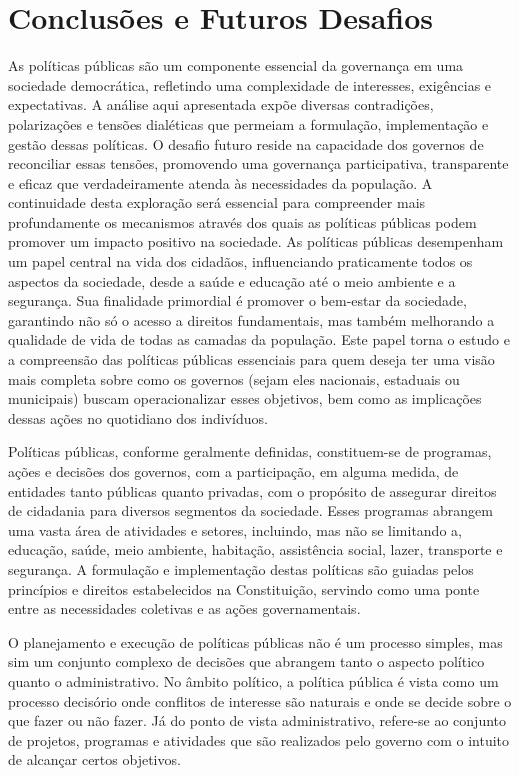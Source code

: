 \documentclass[
   article,       
   12pt,          
   oneside,       
   a4paper,       
   english,       
   brazil,        
   sumario=tradicional
   ]{abntex2}
\begin{document}
\section{Conclusões e Futuros Desafios}
As políticas públicas são um componente essencial da governança em uma sociedade democrática, refletindo uma complexidade de interesses, exigências e expectativas. A análise aqui apresentada expõe diversas contradições, polarizações e tensões dialéticas que permeiam a formulação, implementação e gestão dessas políticas. O desafio futuro reside na capacidade dos governos de reconciliar essas tensões, promovendo uma governança participativa, transparente e eficaz que verdadeiramente atenda às necessidades da população. A continuidade desta exploração será essencial para compreender mais profundamente os mecanismos através dos quais as políticas públicas podem promover um impacto positivo na sociedade.
As políticas públicas desempenham um papel central na vida dos cidadãos, influenciando praticamente todos os aspectos da sociedade, desde a saúde e educação até o meio ambiente e a segurança. Sua finalidade primordial é promover o bem-estar da sociedade, garantindo não só o acesso a direitos fundamentais, mas também melhorando a qualidade de vida de todas as camadas da população. Este papel torna o estudo e a compreensão das políticas públicas essenciais para quem deseja ter uma visão mais completa sobre como os governos (sejam eles nacionais, estaduais ou municipais) buscam operacionalizar esses objetivos, bem como as implicações dessas ações no quotidiano dos indivíduos.

Políticas públicas, conforme geralmente definidas, constituem-se de programas, ações e decisões dos governos, com a participação, em alguma medida, de entidades tanto públicas quanto privadas, com o propósito de assegurar direitos de cidadania para diversos segmentos da sociedade. Esses programas abrangem uma vasta área de atividades e setores, incluindo, mas não se limitando a, educação, saúde, meio ambiente, habitação, assistência social, lazer, transporte e segurança. A formulação e implementação destas políticas são guiadas pelos princípios e direitos estabelecidos na Constituição, servindo como uma ponte entre as necessidades coletivas e as ações governamentais.

O planejamento e execução de políticas públicas não é um processo simples, mas sim um conjunto complexo de decisões que abrangem tanto o aspecto político quanto o administrativo. No âmbito político, a política pública é vista como um processo decisório onde conflitos de interesse são naturais e onde se decide sobre o que fazer ou não fazer. Já do ponto de vista administrativo, refere-se ao conjunto de projetos, programas e atividades que são realizados pelo governo com o intuito de alcançar certos objetivos.
\end{document}
